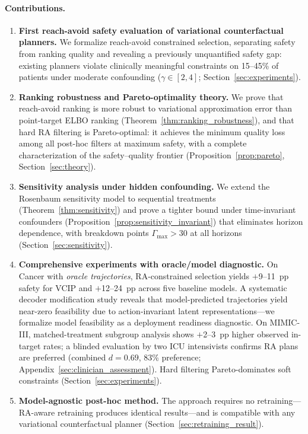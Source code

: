 \documentclass{article}
\begin{document}
\paragraph{Contributions.}
\begin{enumerate}[leftmargin=*,itemsep=1pt,topsep=2pt]
\item \textbf{First reach-avoid safety evaluation of variational counterfactual planners.} We formalize reach-avoid constrained selection, separating safety from ranking quality and revealing a previously unquantified safety gap: existing planners violate clinically meaningful constraints on 15--45\% of patients under moderate confounding ($\gamma \in [2,4]$; Section~\ref{sec:experiments}).
\item \textbf{Ranking robustness and Pareto-optimality theory.} We prove that reach-avoid ranking is more robust to variational approximation error than point-target ELBO ranking (Theorem~\ref{thm:ranking_robustness}), and that hard RA filtering is Pareto-optimal: it achieves the minimum quality loss among all post-hoc filters at maximum safety, with a complete characterization of the safety--quality frontier (Proposition~\ref{prop:pareto}, Section~\ref{sec:theory}).
\item \textbf{Sensitivity analysis under hidden confounding.} We extend the Rosenbaum sensitivity model to sequential treatments (Theorem~\ref{thm:sensitivity}) and prove a tighter bound under time-invariant confounders (Proposition~\ref{prop:sensitivity_invariant}) that eliminates horizon dependence, with breakdown points $\Gamma_{\max} > 30$ at all horizons (Section~\ref{sec:sensitivity}).
\item \textbf{Comprehensive experiments with oracle/model diagnostic.} On Cancer with \emph{oracle trajectories}, RA-constrained selection yields $+$9--11~pp safety for VCIP and $+$12--24~pp across five baseline models. A systematic decoder modification study reveals that model-predicted trajectories yield near-zero feasibility due to action-invariant latent representations---we formalize model feasibility as a deployment readiness diagnostic. On MIMIC-III, matched-treatment subgroup analysis shows $+$2--3~pp higher observed in-target rates; a blinded evaluation by two ICU intensivists confirms RA plans are preferred (combined $d = 0.69$, 83\% preference; Appendix~\ref{sec:clinician_assessment}). Hard filtering Pareto-dominates soft constraints (Section~\ref{sec:experiments}).
\item \textbf{Model-agnostic post-hoc method.} The approach requires no retraining---RA-aware retraining produces identical results---and is compatible with any variational counterfactual planner (Section~\ref{sec:retraining_result}).
\end{enumerate}
\end{document}
